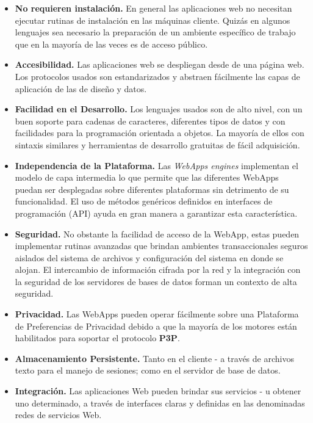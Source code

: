 \begin{itemize}
\item \textbf{No requieren instalación.} En general las aplicaciones web no necesitan ejecutar rutinas de instalación en las máquinas cliente. Quizás en algunos lenguajes sea necesario la preparación de un ambiente específico de trabajo que en la mayoría de las veces es de acceso público.

\item \textbf{Accesibilidad.} Las aplicaciones web se despliegan desde de una página web. Los protocolos usados son estandarizados y abstraen fácilmente las capas de aplicación de las de diseño y datos.

\item \textbf{Facilidad en el Desarrollo.} Los lenguajes usados son de alto nivel, con un buen soporte para cadenas de caracteres, diferentes tipos de datos y con facilidades para la programación orientada a objetos. La mayoría de ellos con sintaxis similares y herramientas de desarrollo gratuitas de fácil adquisición. 

\item \textbf{Independencia de la Plataforma.} Las \textit{WebApps engines} implementan el modelo de capa intermedia lo que permite que las diferentes WebApps puedan ser desplegadas sobre diferentes plataformas sin detrimento de su funcionalidad. El uso de métodos genéricos definidos en interfaces de programación (API) ayuda en gran manera a garantizar esta característica.

\item \textbf{Seguridad.} No obstante la facilidad de acceso de la WebApp, estas pueden implementar rutinas avanzadas que brindan ambientes transaccionales seguros aislados del sistema de archivos y configuración del sistema en donde se alojan. El intercambio de información cifrada por la red y la integración con la seguridad de los servidores de bases de datos forman un contexto de alta seguridad.

\item \textbf{Privacidad.} Las WebApps pueden operar fácilmente sobre una Plataforma de Preferencias de Privacidad debido a que la mayoría de los motores están habilitados para soportar el protocolo \textbf{P3P}.

\item \textbf{Almacenamiento Persistente.} Tanto en el cliente - a través de archivos texto para el manejo de sesiones; como en el servidor de base de datos.

\item \textbf{Integración.} Las aplicaciones Web pueden brindar sus servicios - u obtener uno determinado, a través de interfaces claras y definidas en las denominadas redes de servicios Web.
\end{itemize}
